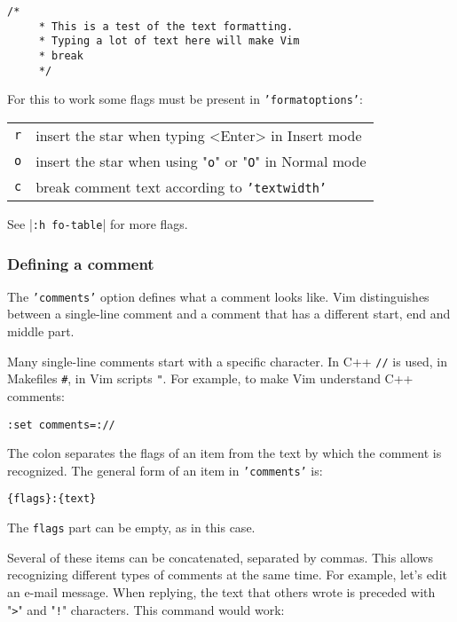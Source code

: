 {\begin{Verbatim}[samepage=true]
    /* 
     * This is a test of the text formatting. 
     * Typing a lot of text here will make Vim 
     * break 
     */ 
\end{Verbatim}

For this to work some flags must be present in \texttt{'formatoptions'}:

\begin{center} \begin{tabular}{c l}
\texttt{r} & insert the star when typing <Enter> in Insert mode \\
\texttt{o} & insert the star when using "\texttt{o}" or "\texttt{O}" in Normal mode \\
\texttt{c} & break comment text according to \texttt{'textwidth'} \\
\end{tabular} \end{center}

See |\texttt{:h fo-table}| for more flags.

\subsubsection{Defining a comment}
The \texttt{'comments'} option defines what a comment looks like.
Vim distinguishes between a single-line comment and a comment that has a different start, end and middle part.

Many single-line comments start with a specific character.
In C++ \texttt{//} is used, in Makefiles \texttt{\#}, in Vim scripts \texttt{"}.
For example, to make Vim understand C++ comments:

\begin{Verbatim}[samepage=true]
 :set comments=://
\end{Verbatim}

The colon separates the flags of an item from the text by which the comment is recognized.
The general form of an item in \texttt{'comments'} is:

\begin{Verbatim}[samepage=true]
    {flags}:{text}
\end{Verbatim}

The \texttt{{flags}} part can be empty, as in this case.

Several of these items can be concatenated, separated by commas.
This allows recognizing different types of comments at the same time.
For example, let's edit an e-mail message.
When replying, the text that others wrote is preceded with "\texttt{>}" and "\texttt{!}" characters.
This command would work:

}
